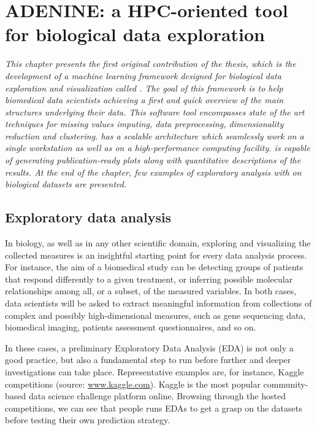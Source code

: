 
\chapter{ADENINE: a HPC-oriented tool for biological data exploration} \label{chap:adenine}

\begin{displayquote}
\textit{This chapter presents the first original contribution of the thesis, which is the 	 development of a machine learning framework designed for biological data exploration and visualization called \ade.
The goal of this framework is to help biomedical data scientists achieving a first and quick overview of the main structures underlying their data.
This software tool encompasses state of the art techniques for missing values imputing, data preprocessing, dimensionality reduction and clustering.
\ade has a scalable architecture which seamlessly work on a single workstation as well as on a high-performance computing facility.
\ade is capable of generating publication-ready plots along with quantitative descriptions of the results.
At the end of the chapter, few examples of exploratory analysis with \ade on biological datasets are presented.}
\end{displayquote}


\section{Exploratory data analysis} \label{sec:data_exploration}
In biology, as well as in any other scientific domain, exploring and visualizing the collected measures is an insightful starting point for every data analysis process.
For instance, the aim of a biomedical study can be detecting groups of patients that respond differently to a given treatment, or inferring possible molecular relationships among all, or a subset, of the measured variables.
In both cases, data scientists will be asked to extract meaningful information from collections of complex and possibly high-dimensional measures, such as gene sequencing data, biomedical imaging, patients assessment questionnaires, and so on.

In these cases, a preliminary Exploratory Data Analysis (\ac{EDA}) is not only a good practice, but also a fundamental step to run before further and deeper investigations can take place.
Representative examples are, for instance, Kaggle competitions (source: \url{www.kaggle.com}). Kaggle is the most popular community-based data science challenge platform online. Browsing through the hosted competitions, we can see that people runs EDAs to get a grasp on the datasets before testing their own prediction strategy.

